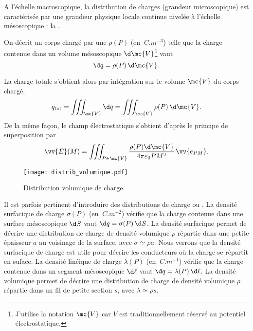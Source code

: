 \documentclass[12pt,fancy]{/Users/victor/Documents/COURS/2ACapECL/texmf/tex/latex/Preambles/cours}
\begin{document}
\begin{definition}
A l'échelle macroscopique, la distribution de charges (grandeur microscopique) est caractérisée par une grandeur physique locale continue nivelée à l'échelle mésoscopique : la .

On décrit un corps chargé par une  $\rho(P)$ (en $\SI{}{C.m^{-3}}$) telle que la charge contenue dans un volume mésoscopique $\d \mc{V}$\footnote{J'utilise la notation $\mc{V}$ car $V$ est  traditionnellement réservé au potentiel électrostatique.} vaut
\begin{equation*}
\d q=\rho(P)\,\d \mc{V}.
\end{equation*}
\end{definition}
\noindent
La charge totale s’obtient alors par intégration sur le volume $\mc{V}$ du corps chargé,
\begin{equation*}
 q_{\rm{tot}}=\iiint_{\mc{V}}\d q=\iiint_{\mc{V}}\rho(P)\,\d \mc{V}.
 \end{equation*}
De la même façon, le champ électrostatique s’obtient d’après le principe de superposition par
\begin{equation*}
\label{eq:champE_distrib_continue}
\vv{E}(M)=\iiint_{P\in\mc{V}}\frac{\rho(P)\d\mc{V}}{4\pi\varepsilon_0 PM^2}\,\vv{e_{PM}}.
\end{equation*}

\begin{figure}[h!]
\centering
\texttt{[image: distrib\_volumique.pdf]}
\caption{Distribution volumique de charge.}
\end{figure}

\noindent Il est parfois pertinent d’introduire des distributions de charge  ou . La densité surfacique de charge $\sigma(P)$ (en $\SI{}{C.m^{-2}}$) vérifie que la charge contenue dans une surface mésoscopique $\d S$ vaut $
\d q=\sigma(P)\,\d S$. La densité surfacique permet de décrire une distribution de charge de densité volumique $\rho$ répartie dans une petite épaisseur $a$ au voisinage de la surface, avec $\sigma \simeq \rho a$. Nous verrons que la densité surfacique de charge est utile pour décrire les conducteurs où la charge se répartit en suface. La densité linéique de charge $\lambda(P)$ (en $\SI{}{C.m^{-1}}$) vérifie que la charge contenue dans un segment mésoscopique $\d \ell$ vaut $
\d q=\lambda(P)\,\d \ell$. La densité volumique permet de décrire une distribution de charge de densité volumique $\rho$ répartie dans un fil de petite section $s$, avec $\lambda \simeq \rho s$.
\end{document}
